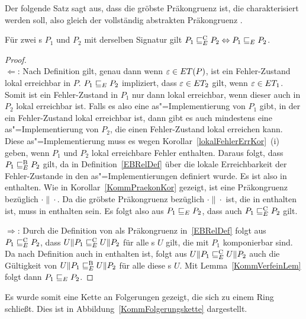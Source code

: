 Der folgende Satz sagt aus, dass \ERel{} die gröbste Präkongruenz ist, die
charakterisiert werden soll, also gleich der vollständig abstrakten
Präkongruenz \ECRel{}.

\begin{Satz}
  \label{KommVollAbstraktSatz}
  Für zwei \MEIO{}s $P_1$ und $P_2$ mit derselben Signatur gilt $P_1 \sqsubseteq  _E^\mathrm{C}
  P_2\Leftrightarrow P_1 \sqsubseteq  _E{} P_2$.
\end{Satz}
\begin{proof}\mbox{}\\
  \glqq$\Leftarrow$\grqq: Nach Definition gilt, genau dann wenn
  $\varepsilon\in ET (P)$, ist ein Fehler-Zustand lokal erreichbar in $P$. $P_1
   \sqsubseteq  _E P_2$ impliziert, dass $\varepsilon\in ET _2$ gilt, wenn
  $\varepsilon\in ET _1$. Somit ist ein Fehler-Zustand in $P_1$ nur dann lokal
  erreichbar, wenn dieser auch in $P_2$ lokal erreichbar ist. Falls es also
  eine as"=Implementierung von $P_1$ gibt, in der ein Fehler-Zustand lokal
  erreichbar ist, dann gibt es auch mindestens eine as"=Implementierung von
  $P_2$, die einen Fehler-Zustand lokal erreichen kann. Diese
  as"=Implementierung muss es wegen Korollar~\ref{lokalFehlerErrKor}~(i) geben,
  wenn $P_1$ und $P_2$ lokal erreichbare Fehler enthalten. Daraus folgt, dass
  $P_1 \sqsubseteq  _E^\mathrm{B} P_2$ gilt, da \EBRel{} in Definition~\ref{EBRelDef} über die
  lokale Erreichbarkeit der Fehler-Zustande in den as"=Implementierungen
  definiert wurde. Es ist also \ERel{} in \EBRel{} enthalten. Wie in
  Korollar~\ref{KommPraekonKor} gezeigt, ist \ERel{} eine Präkongruenz
  bezüglich $\cdot\|\cdot$. Da \ECRel{} die gröbste Präkongruenz bezüglich
  $\cdot\|\cdot$ ist, die in \EBRel{} enthalten ist, muss \ERel{} in \ECRel{}
  enthalten sein. Es folgt also aus $P_1 \sqsubseteq  _E P_2$, dass auch $P_1 \sqsubseteq  _E^\mathrm{C} P_2$
  gilt.

  \glqq$\Rightarrow$\grqq: Durch die Definition von \ECRel{} als Präkongruenz
  in~\ref{EBRelDef} folgt aus $P_1 \sqsubseteq  _E^\mathrm{C}{} P_2$, dass $U\|P_1 \sqsubseteq  _E^\mathrm{C} U\|P_2$ für
  alle \MEIO{}s $U$ gilt, die mit $P_1$ komponierbar sind. Da \ECRel{} nach
  Definition auch in \EBRel{} enthalten ist, folgt aus $U\|P_1 \sqsubseteq  _E^\mathrm{C}{}
  U\|P_2$ auch die Gültigkeit von $U\|P_1 \sqsubseteq  _E^\mathrm{B}{}U\|P_2$ für alle diese
  \MEIO{}s $U$. Mit Lemma~\ref{KommVerfeinLem} folgt dann $P_1 \sqsubseteq  _E{} P_2$.
\end{proof}

Es wurde somit eine Kette an Folgerungen gezeigt, die sich zu einem Ring
schließt. Dies ist in Abbildung~\ref{KommFolgerungskette} dargestellt.

